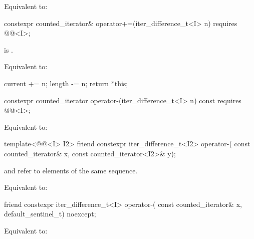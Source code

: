 \begin{itemdescr}
\pnum
\effects
Equivalent to: 
\end{itemdescr}

%
\begin{itemdecl}
constexpr counted_iterator& operator+=(iter_difference_t<I> n)
  requires @@<I>;
\end{itemdecl}

\begin{itemdescr}
\pnum
\hardexpects
{} is .

\pnum
\effects
Equivalent to:
\begin{codeblock}
current += n;
length -= n;
return *this;
\end{codeblock}
\end{itemdescr}

%
\begin{itemdecl}
constexpr counted_iterator operator-(iter_difference_t<I> n) const
  requires @@<I>;
\end{itemdecl}

\begin{itemdescr}
\pnum
\effects
Equivalent to: 
\end{itemdescr}

%
\begin{itemdecl}
template<@@<I> I2>
  friend constexpr iter_difference_t<I2> operator-(
    const counted_iterator& x, const counted_iterator<I2>& y);
\end{itemdecl}

\begin{itemdescr}
\pnum
\expects
{} and  refer to elements of the same
sequence.

\pnum
\effects
Equivalent to: 
\end{itemdescr}

%
\begin{itemdecl}
friend constexpr iter_difference_t<I> operator-(
  const counted_iterator& x, default_sentinel_t) noexcept;
\end{itemdecl}

\begin{itemdescr}
\pnum
\effects
Equivalent to:
\end{itemdescr}

